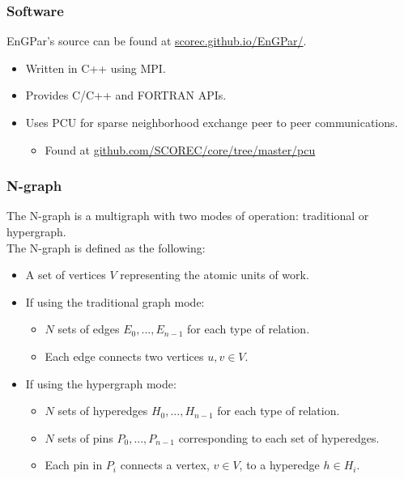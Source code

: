 \documentclass{beamer}
\begin{document}
\begin{frame}
  \frametitle{Software}
  EnGPar's source can be found at \url{scorec.github.io/EnGPar/}.
  \begin{itemize}
  \item Written in C++ using MPI.
  \item Provides C/C++ and FORTRAN APIs.
  \item Uses PCU for sparse neighborhood exchange peer to peer communications.
    \begin{itemize}
      \item Found at \url{github.com/SCOREC/core/tree/master/pcu}
      \end{itemize}
  \end{itemize}
\end{frame}

\begin{frame}
  \frametitle{N-graph}
  The N-graph is a multigraph with two modes of operation: traditional or hypergraph.\\
  \smallskip
  The N-graph is defined as the following:
  \begin{itemize}
  \item A set of vertices $V$ representing the atomic units of work.
  \item If using the traditional graph mode:
    \begin{itemize}
    \item $N$ sets of edges $E_0,...,E_{n-1}$ for each type of relation.
    \item Each edge connects two vertices $u,v \in V$.
    \end{itemize}
  \item If using the hypergraph mode:
    \begin{itemize}
    \item $N$ sets of hyperedges $H_0,...,H_{n-1}$ for each type of relation.
    \item $N$ sets of pins $P_0,...,P_{n-1}$ corresponding to each set of hyperedges.
    \item Each pin in $P_i$ connects a vertex, $v \in V$, to a hyperedge $h \in H_i$.
    \end{itemize}
  \end{itemize}
\end{frame}
\end{document}
